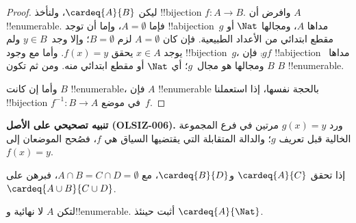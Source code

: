 \documentclass[../../../include/open-logic-section]{subfiles}
\begin{document}
\begin{proof}
ليكن $\cardeq{A}{B}$، ولنأخذ !!{bijection} $f \colon A
\to B$. وافرض أن $A$ !!{enumerable}.
{
فإما $A  = \emptyset$، وإما أن توجد !!a{bijection}~$g$ مداها $A$، ومجالها $\Nat$ أو مقطع ابتدائي من الأعداد الطبيعية. فإن كان $A = \emptyset$ لزم $B =
\emptyset$؛ وإلا وجد~$y \in B$ ولم يوجد $x
\in A$ يحقق $f(x) = y$. وأما مع وجود !!{bijection}~$g$، فإن $\comp{g}{f}$ !!a{bijection} مداها~$B$ ومجالها هو مجال~$g$؛ أي $\Nat$ أو مقطع ابتدائي منه. ومن ثم تكون $B$ !!{enumerable}.}

وأما إن كانت $B$ !!{enumerable}، فإن $A$ !!{enumerable} بالحجة نفسها، إذا استعملنا !!{bijection} $f^{-1}\colon B \to A$ في موضع~$f$.
\end{proof}

\begin{editorial}
\textbf{تنبيه تصحيحي على الأصل (OLSIZ-006).}
ورد $g(x)=y$ مرتين في فرع المجموعة الخالية قبل تعريف $g$؛ والدالة
المتقابلة التي يقتضيها السياق هي $f$، فصُحح الموضعان إلى $f(x)=y$.
\end{editorial}

\begin{prob}
إذا تحقق $\cardeq{A}{C}$ و$\cardeq{B}{D}$، مع $A \cap B =
C \cap D = \emptyset$، فبرهن على $\cardeq{A \cup B}{C \cup D}$.
\end{prob}

\begin{prob}
لتكن $A$ لا نهائية و!!{enumerable}. أثبت حينئذ $\cardeq{A}{\Nat}$.
\end{prob}
\end{document}
